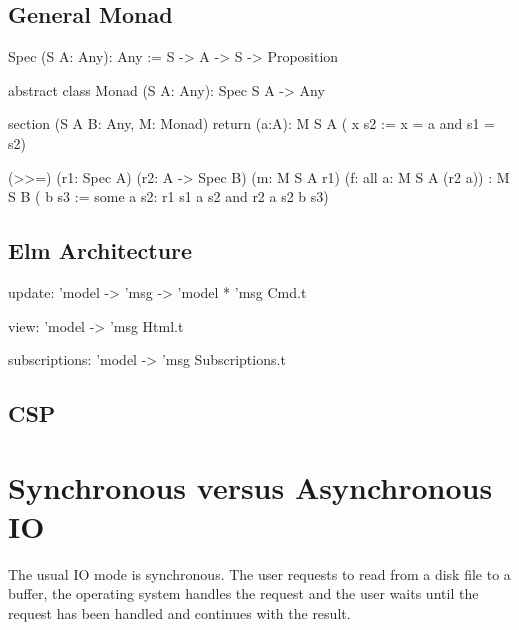 \subsection{General Monad}

\begin{alba}
  Spec (S A: Any): Any
    := S -> A -> S -> Proposition


  abstract class
    Monad (S A: Any): Spec S A -> Any

  section (S A B: Any, M: Monad)
    return (a:A): M S A
                    ( x s2 :=  x = a  and  s1 = s2)

    (>>=) (r1: Spec A)
          (r2: A -> Spec B)
          (m: M S A r1)
          (f: all a: M S A (r2 a))
          : M S B
              ( b s3 :=
                  some a s2:
                    r1 s1 a s2
                    and
                    r2 a s2 b s3)
\end{alba}











\subsection{Elm Architecture}


\begin{ocaml}
  update: 'model -> 'msg -> 'model * 'msg Cmd.t

  view: 'model -> 'msg Html.t

  subscriptions: 'model -> 'msg Subscriptions.t
\end{ocaml}






\subsection{CSP}













\section{Synchronous versus Asynchronous IO}

The usual IO mode is synchronous. The user requests to read from a disk file
to a buffer, the operating system handles the request and the user waits
until the request has been handled and continues with the result.

